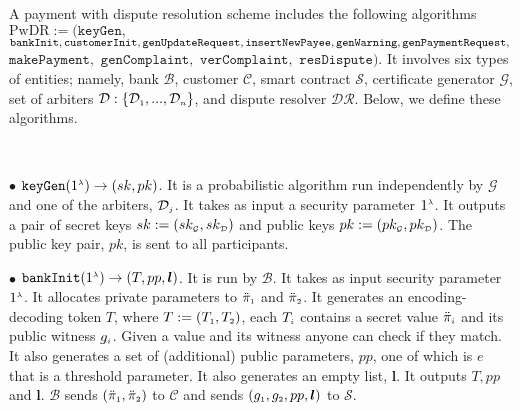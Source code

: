 \begin{definition} A payment with dispute resolution  scheme  includes the following   algorithms $\text{PwDR}:=(\mathtt{keyGen}, $ $\mathtt{bankInit}, \mathtt{customerInit},  \mathtt{genUpdateRequest}, \mathtt{insertNewPayee}, \mathtt{genWarning}, \mathtt{genPaymentRequest}, \\$ $\mathtt{makePayment}, $ $ \mathtt{genComplaint}, $ $\mathtt{verComplaint},$ $ \mathtt{resDispute})$. It involves  six   types of entities; namely,  bank $\mathcal{B}$, customer $\mathcal{C}$,  smart contract $\mathcal{S}$,  certificate generator $\mathcal{G}$,   set of arbiters $\mathcal{D}:\{\mathcal{D}_{\scriptscriptstyle 1},..., \mathcal{D}_{\scriptscriptstyle n}\}$, and  dispute resolver $\mathcal{DR}$. Below, we define these algorithms.  

%
\

\item [$\bullet$]  $\mathtt{keyGen}(1^{\scriptscriptstyle \lambda})\rightarrow (sk,pk)$. It is a probabilistic  algorithm run independently by  $\mathcal{G}$ and one of the arbiters, $\mathcal{D}_{\scriptscriptstyle j}$. It takes as input a security parameter $1^{\scriptscriptstyle \lambda}$. It outputs a pair of secret keys $sk:=(sk_{\scriptscriptstyle\mathcal {G}},sk_{\scriptscriptstyle\mathcal {D}})$ and public keys $pk:=(pk_{\scriptscriptstyle\mathcal {G}},pk_{\scriptscriptstyle\mathcal {D}})$. The public key pair, $pk$, is sent to all participants. 


\vspace{2mm}
\item[$\bullet$] $\mathtt{bankInit}(1^{\scriptscriptstyle \lambda})\rightarrow (T, pp, \bm{l})$. It is  run by  $\mathcal{B}$. It takes as input  security parameter $1^{\scriptscriptstyle \lambda}$.  It allocates private parameters to  $\ddot\pi_{\scriptscriptstyle 1}$ and $\ddot\pi_{\scriptscriptstyle 2}$. It generates an encoding-decoding token $T$, where  $T:=(T_{\scriptscriptstyle 1},T_{\scriptscriptstyle 2})$,  each $T_{\scriptscriptstyle i}$  contains  a secret value $\ddot\pi_{\scriptscriptstyle i}$ and its public witness $g_{\scriptscriptstyle i}$.    Given a  value and its witness anyone can check if they match. It also generates a set of (additional) public parameters,  $pp$, one of which is $e$ that is a threshold parameter.  It also generates an  empty list, $\bm{l}$. It outputs $T, pp$ and $\bm l$.  $\mathcal{B}$ sends $(\ddot\pi_{\scriptscriptstyle 1}, \ddot\pi_{\scriptscriptstyle 2})$ to $\mathcal{C}$ and sends $(g_{\scriptscriptstyle 1}, g_{\scriptscriptstyle 2},  pp, \bm {l})$ to $\mathcal{S}$.


\end{definition}

